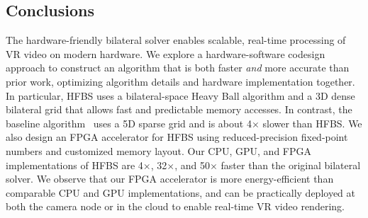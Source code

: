 \subsection{Conclusions}

The hardware-friendly bilateral solver enables scalable, real-time processing of VR video on modern hardware.
We explore a hardware-software codesign approach to construct an algorithm that is both faster \emph{and} more accurate than prior work, optimizing algorithm details and hardware implementation together. 
In particular, HFBS uses a bilateral-space Heavy Ball algorithm and a 3D dense bilateral grid that allows fast and predictable memory accesses. 
In contrast, the baseline algorithm~\cite{BarronPoole2016} uses a 5D sparse grid and is about 4$\times$ slower than HFBS. 
We also design an FPGA accelerator for HFBS using reduced-precision fixed-point numbers and customized memory layout. 
Our CPU, GPU, and FPGA implementations of HFBS are 4$\times$, 32$\times$, and 50$\times$ faster than the original bilateral solver. 
We observe that our FPGA accelerator is more energy-efficient than comparable CPU and GPU implementations, and can be practically deployed at both the camera node or in the cloud to enable real-time VR video rendering.

